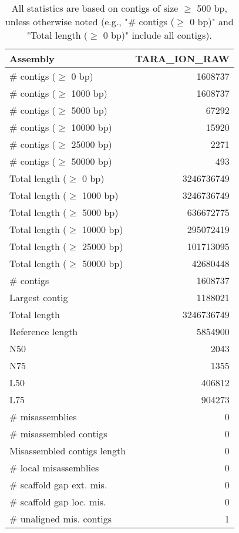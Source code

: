 \documentclass[12pt,a4paper]{article}
\begin{document}
\begin{table}[ht]
\begin{center}
\caption{All statistics are based on contigs of size $\geq$ 500 bp, unless otherwise noted (e.g., "\# contigs ($\geq$ 0 bp)" and "Total length ($\geq$ 0 bp)" include all contigs).}
\begin{tabular}{|l*{1}{|r}|}
\hline
Assembly & TARA\_ION\_RAW \\ \hline
\# contigs ($\geq$ 0 bp) & 1608737 \\ \hline
\# contigs ($\geq$ 1000 bp) & 1608737 \\ \hline
\# contigs ($\geq$ 5000 bp) & 67292 \\ \hline
\# contigs ($\geq$ 10000 bp) & 15920 \\ \hline
\# contigs ($\geq$ 25000 bp) & 2271 \\ \hline
\# contigs ($\geq$ 50000 bp) & 493 \\ \hline
Total length ($\geq$ 0 bp) & 3246736749 \\ \hline
Total length ($\geq$ 1000 bp) & 3246736749 \\ \hline
Total length ($\geq$ 5000 bp) & 636672775 \\ \hline
Total length ($\geq$ 10000 bp) & 295072419 \\ \hline
Total length ($\geq$ 25000 bp) & 101713095 \\ \hline
Total length ($\geq$ 50000 bp) & 42680448 \\ \hline
\# contigs & 1608737 \\ \hline
Largest contig & 1188021 \\ \hline
Total length & 3246736749 \\ \hline
Reference length & 5854900 \\ \hline
N50 & 2043 \\ \hline
N75 & 1355 \\ \hline
L50 & 406812 \\ \hline
L75 & 904273 \\ \hline
\# misassemblies & 0 \\ \hline
\# misassembled contigs & 0 \\ \hline
Misassembled contigs length & 0 \\ \hline
\# local misassemblies & 0 \\ \hline
\# scaffold gap ext. mis. & 0 \\ \hline
\# scaffold gap loc. mis. & 0 \\ \hline
\# unaligned mis. contigs & 1 \\ \hline

\end{tabular}
\end{center}
\end{table}
\end{document}
